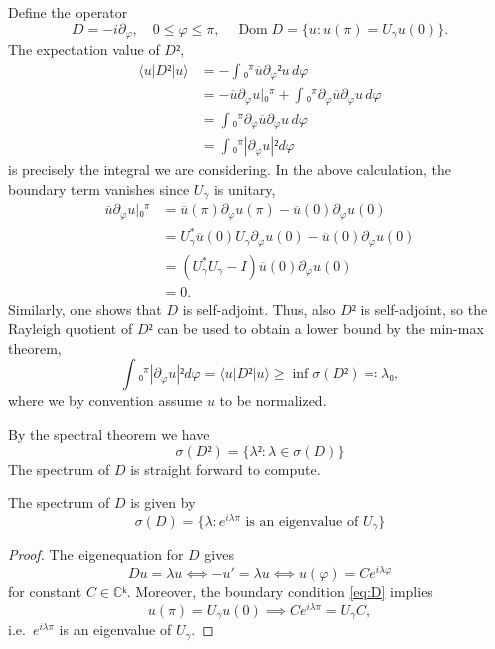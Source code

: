 Define the operator
\begin{equation}\label{eq:D}
  D = -i∂_φ, \quad 0≤φ≤π, \quad \operatorname{Dom}D = \{u : u(π) = U_γu(0)\}.
\end{equation}
The expectation value of $D²$,
\begin{equation}
  \begin{aligned}
    ⟨u|D²|u⟩
    &= -∫₀^π \overline{u} ∂_φ² u \,dφ \\
    &= -\overline{u}∂_φu\Big|₀^π + ∫₀^π ∂_φ\overline{u} ∂_φ u \,dφ \\
    &= ∫₀^π ∂_φ\overline{u} ∂_φ u \,dφ \\
    &= ∫₀^π |∂_φu|² dφ
  \end{aligned}
\end{equation}
is precisely the integral we are considering. In the above calculation, the boundary term vanishes since $U_γ$ is unitary,
\begin{equation}
  \begin{aligned}
    \overline{u}∂_φu\Big|₀^π
    &= \overline{u}(π)∂_φu(π) - \overline{u}(0)∂_φu(0) \\
    &= U_γ^*\overline{u}(0)U_γ∂_φu(0) - \overline{u}(0)∂_φu(0) \\
    &= (U_γ^*U_γ - I)\overline{u}(0)∂_φu(0) \\
    &= 0.
  \end{aligned}
\end{equation}
Similarly, one shows that $D$ is self-adjoint. Thus, also $D²$ is self-adjoint, so the Rayleigh quotient of $D²$ can be used to obtain a lower bound by the min-max theorem,
\begin{equation}
  ∫₀^π |∂_φu|² dφ = ⟨u|D²|u⟩ ≥ \inf σ(D²) ≕ λ₀,
\end{equation}
where we by convention assume $u$ to be normalized.

By the spectral theorem we have
\begin{equation}
  σ(D²) = \{λ² : λ ∈ σ(D)\}
\end{equation}
The spectrum of $D$ is straight forward to compute.

\begin{lemma}
  The spectrum of $D$ is given by
  \begin{equation}
    σ(D) = \{ λ : e^{iλπ} \text{ is an eigenvalue of $U_γ$} \}
  \end{equation}
\end{lemma}
\begin{proof}
  The eigenequation for $D$ gives
  \begin{equation}
    Du = λu ⟺ -u' = λu ⟺ u(φ) = C e^{iλφ}
  \end{equation}
  for constant $C ∈ ℂᵏ$. Moreover, the boundary condition \cref{eq:D} implies
  \begin{equation}
    u(π) = U_γ u(0) ⟹ Ce^{iλπ} = U_γC,
  \end{equation}
  i.e.\ $e^{iλπ}$ is an eigenvalue of $U_γ$.
\end{proof}

